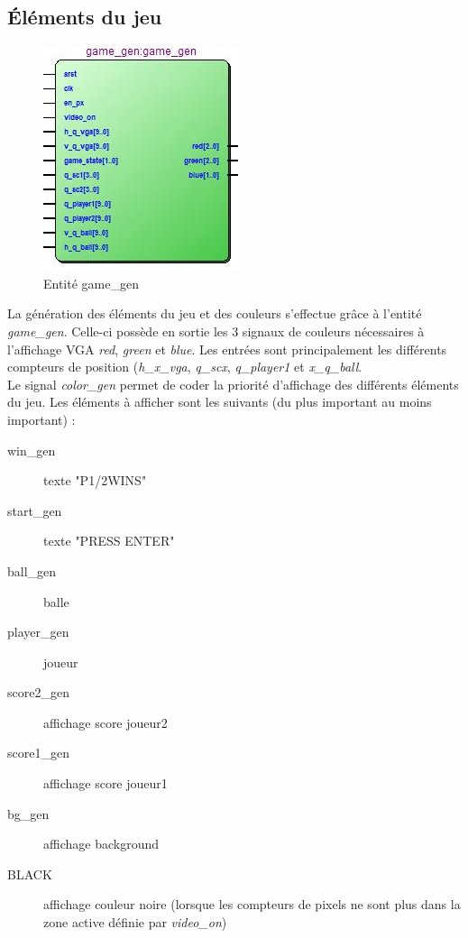 \newpage
\subsection{Éléments du jeu}
\begin{figure}[h!]
	\centering
	\includegraphics[scale=1.0]{images/gamegen.jpg}
	\caption{Entité game\_gen}
	\label{fig:gamegen}
\end{figure}

La génération des éléments du jeu et des couleurs s'effectue grâce à l'entité \emph{game\_gen}. Celle-ci possède en sortie les 3 signaux de couleurs nécessaires à l'affichage VGA \emph{red}, \emph{green} et \emph{blue}. Les entrées sont principalement les différents compteurs de position (\emph{h\_x\_vga},  \emph{q\_scx}, \emph{q\_player1} et \emph{x\_q\_ball}.\\

Le signal \emph{color\_gen} permet de coder la priorité d'affichage des différents éléments du jeu. Les éléments à afficher sont les suivants (du plus important au moins important) :
\begin{description}
\item[win\_gen] texte "P1/2WINS"
\item[start\_gen] texte "PRESS ENTER"
\item[ball\_gen] balle
\item[player\_gen] joueur
\item[score2\_gen] affichage score joueur2
\item[score1\_gen] affichage score joueur1
\item[bg\_gen] affichage background
\item[BLACK] affichage couleur noire (lorsque les compteurs de pixels ne sont plus dans la zone active définie par \emph{video\_on})
\end{description}

\newpage
